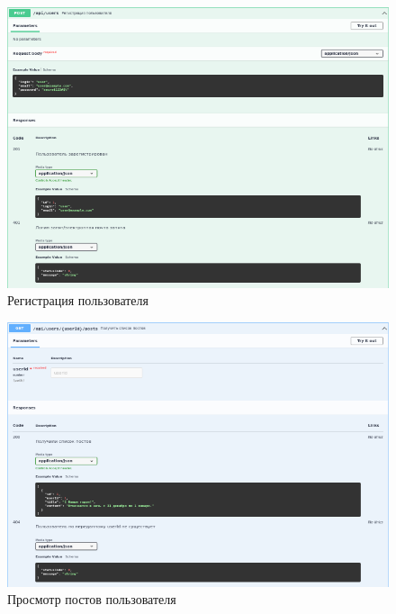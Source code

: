 \documentclass[12pt, a4paper, simple]{eskdtext}
\begin{document}
  \begin{figure}[p!h]
    \centering
    \includegraphics[width=14cm]
    {images/SwaggerUi/2023-02-25_18-06-43.png}
    \caption{Регистрация пользователя}
    \label{fig:more_1}
  \end{figure}

  \begin{figure}[p!h]
    \centering
    \includegraphics[width=14cm]
    {images/SwaggerUi/2023-02-25_18-07-34.png}
    \caption{Просмотр постов пользователя}
    \label{fig:more_2}
  \end{figure}
\end{document}
